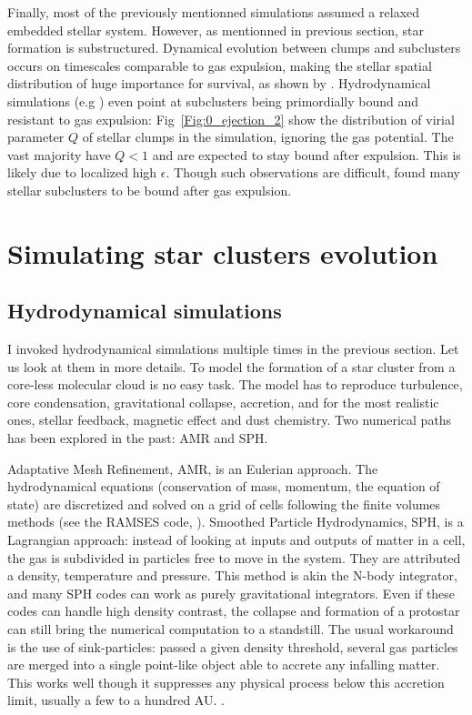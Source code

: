 Finally, most of the previously mentionned simulations assumed a relaxed embedded stellar system. However, as mentionned in previous section, star formation is substructured. Dynamical evolution between clumps and subclusters occurs on timescales comparable to gas expulsion, making the stellar spatial distribution of huge importance for survival, as shown by \cite{Farias2015}. Hydrodynamical simulations (e.g \citealt{Kruijssen2012}) even point at subclusters being primordially bound and resistant to gas expulsion: Fig~\ref{Fig:0_ejection_2} show the distribution of virial parameter $Q$ of stellar clumps in the simulation, ignoring the gas potential. The vast majority have $Q<1$ and are expected to stay bound after expulsion. This is likely due to localized high $\epsilon$. Though such observations are difficult, \cite{Kuhn2015b} found many stellar subclusters to be bound after gas expulsion.


\section{Simulating star clusters evolution}


\subsection{Hydrodynamical simulations}

I invoked hydrodynamical simulations multiple times in the previous section. Let us look at them in more details. To model the formation of a star cluster from a core-less molecular cloud is no easy task. The model has to reproduce turbulence, core condensation, gravitational collapse, accretion, and for the most realistic ones, stellar feedback, magnetic effect and dust chemistry. Two numerical paths has been explored in the past: AMR and SPH.

Adaptative Mesh Refinement, AMR, is an Eulerian approach. The hydrodynamical equations (conservation of mass, momentum, the equation of state) are discretized and solved on a grid of cells following the finite volumes methods (see the RAMSES code, \citealt{Teyssier2002}). Smoothed Particle Hydrodynamics, SPH, is a Lagrangian approach: instead of looking at inputs and outputs of matter in a cell, the gas is subdivided in particles free to move in the system. They are attributed a density, temperature and pressure. This method is akin the N-body integrator, and many SPH codes can work as purely gravitational integrators. Even if these codes can handle high density contrast, the collapse and formation of a protostar can still bring the numerical computation to a standstill. The usual workaround is the use of sink-particles: passed a given density threshold, several gas particles are merged into a single point-like object able to accrete any infalling matter. This works well though it suppresses any physical process below this accretion limit, usually a few to a hundred AU. \citep{Bate1997}.

